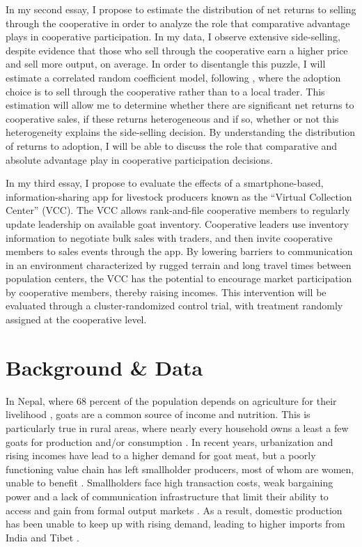 \documentclass[11pt]{article}
\begin{document}
In my second essay, I propose to estimate the distribution of net returns to selling through the cooperative in order to analyze the role that comparative advantage plays in cooperative participation. In my data, I observe extensive side-selling, despite evidence that those who sell through the cooperative earn a higher price and sell more output, on average. In order to disentangle this puzzle, I will estimate a correlated random coefficient model, following \citet{suri11}, where the adoption choice is to sell through the cooperative rather than to a local trader. This estimation will allow me to determine whether there are significant net returns to cooperative sales, if these returns heterogeneous and if so, whether or not this heterogeneity explains the side-selling decision. By understanding the distribution of returns to adoption, I will be able to discuss the role that comparative and absolute advantage play in cooperative participation decisions. 

In my third essay, I propose to evaluate the effects of a smartphone-based, information-sharing app for livestock producers known as the ``Virtual Collection Center'' (VCC). The VCC allows rank-and-file cooperative members to regularly update leadership on available goat inventory. Cooperative leaders use inventory information to negotiate bulk sales with traders, and then invite cooperative members to sales events through the app. By lowering barriers to communication in an environment characterized by rugged terrain and long travel times between population centers, the VCC has the potential to encourage market participation by cooperative members, thereby raising incomes. This intervention will be evaluated through a cluster-randomized control trial, with treatment randomly assigned at the cooperative level. 

\newpage

\section{Background \& Data} \label{sec:background}

In Nepal, where 68 percent of the population depends on agriculture for their livelihood \citep{ILO16}, goats are a common source of income and nutrition. This is particularly true in rural areas, where nearly every household owns a least a few goats for production and/or consumption \citep{upreti09}. In recent years, urbanization and rising incomes have lead to a higher demand for goat meat, but a poorly functioning value chain has left smallholder producers, most of whom are women, unable to benefit \citep{ashby-et.al.09,choudhary-et.al.11,gurung-et.al.15}. Smallholders face high transaction costs, weak bargaining power and a lack of communication infrastructure that limit their ability to access and gain from formal output markets \citep{ashby-et.al.09,kristjanson-et.al.14}. As a result, domestic production has been unable to keep up with rising demand, leading to higher imports from India and Tibet \citep{HI-N12}.
\end{document}
